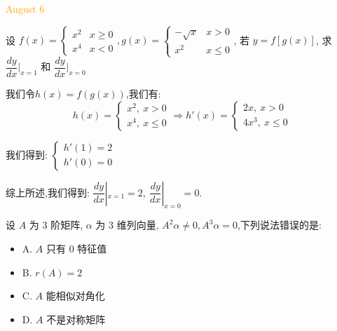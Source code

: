 \textcolor{orange}{August 6}

\begin{example}[][Exam: 34.1.11]
	设 $f(x)=\begin{cases}
		x^2 & x\geq 0\\
		x^4 & x<0
	\end{cases}, g(x)=\begin{cases}
		-\sqrt{x} & x>0\\
		x^2 & x\leq 0
	\end{cases}$, 若 $y=f[g(x)]$, 求 $\dfrac{dy}{dx}\big|_{x=1}$ 和 $\dfrac{dy}{dx}\big|_{x=0}$
\end{example}

\begin{solution}

	我们令$h(x)=f(g(x))$,我们有:  
	$$h(x)=\left\lbrace
	\begin{array}{l}
		x^2,\ x>0\\
		x^4,\ x\leq 0
	\end{array}
	\right. \Rightarrow h'(x)=\left\lbrace
	\begin{array}{l}
		2x,\ x>0\\
		4x^3,\ x\leq 0
	\end{array}
	\right. $$
	
	我们得到:  $\left\lbrace
	\begin{array}{l}
		h'(1)=2\\
		h'(0)=0
	\end{array}
	\right. $
	
	综上所述,我们得到:  $\dfrac{dy}{dx}|_{x=1}=2,\ \dfrac{dy}{dx}|_{x=0}=0$.
\end{solution}

\begin{example}[][Exam: 34.1.12]
	设 $A$ 为 $3$ 阶矩阵, $\alpha$ 为 $3$ 维列向量, $A^2\alpha\neq 0, A^3\alpha=0$,下列说法错误的是:  
\begin{itemize}
	\item A. $A$ 只有 $0$ 特征值
	\item B. $r(A)=2$
	\item C. $A$ 能相似对角化
	\item D. $A$ 不是对称矩阵
\end{itemize}
\end{example}


